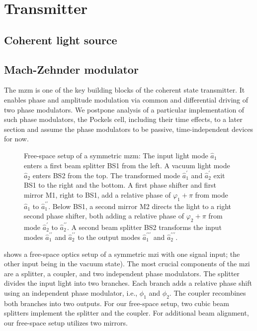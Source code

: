 \section{Transmitter}

\subsection{Coherent light source}


\subsection{Mach-Zehnder modulator}

The \gls{mzm} is one of the key building blocks of the coherent state transmitter.
It enables phase and amplitude modulation via common and differential driving of two phase modulators.
We postpone analysis of a particular implementation of such phase modulators, the Pockels cell, including their time effects, to a later section and assume the phase modulators to be passive, time-independent devices for now.

\begin{figure}[htb]
	\centering
	
	\caption{Free-space setup of a symmetric \gls{mzm}: The input light mode $\hat{a}_1$ enters a first beam splitter BS1 from the left. A vacuum light mode $\hat{a}_2$ enters BS2 from the top. The transformed mode $\hat{a}_1^\prime$ and $\hat{a}_2^\prime$ exit BS1 to the right and the bottom. A first phase shifter and first mirror M1, right to BS1, add a relative phase of $\varphi_1+\pi$ from mode $\hat{a}_1$ to $\hat{a}_1^{\prime\prime}$. Below BS1, a second mirror M2 directs the light to a right second phase shifter, both adding a relative phase of $\varphi_2+\pi$ from mode $\hat{a}_2^\prime$ to $\hat{a}_2^{\prime\prime}$. A second beam splitter BS2 transforms the input modes $\hat{a}_1^{\prime\prime}$ and $\hat{a}_2^{\prime\prime}$ to the output modes $\hat{a}_1^{\prime\prime\prime}$ and $\hat{a}_2^{\prime\prime\prime}$.}\label{fig:mzi_symmetric}
\end{figure}
 shows a free-space optics setup of a symmetric \gls{mzi} with one signal input; the other input being in the vacuum state).
The most crucial components of the \gls{mzi} are a splitter, a coupler, and two independent phase modulators.
The splitter divides the input light into two branches.
Each branch adds a relative phase shift using an independent phase modulator, i.e., $\phi_1$ and $\phi_2$.
The coupler recombines both branches into two outputs.
For our free-space setup, two cubic beam splitters implement the splitter and the coupler.
For additional beam alignment, our free-space setup utilizes two mirrors.

